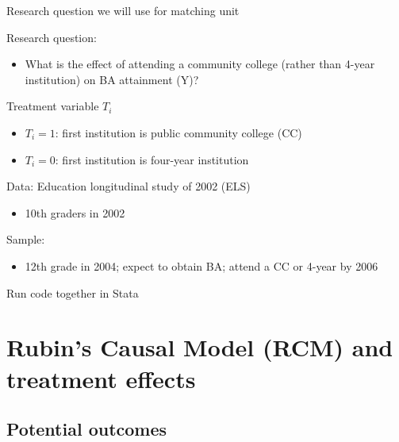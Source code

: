 \begin{frame}{Research question we will use for matching unit}

	Research question:
	\begin{itemize}
		\item What is the effect of attending a community college (rather than 4-year institution) on BA attainment (Y)?
	\end{itemize}
	\vspace{2mm}
	
	Treatment variable $ T_i $
	\begin{itemize}
		\item $ T_i=1 $: first institution is public community college (CC)
		\item $ T_i=0 $: first institution is four-year institution			
	\end{itemize}
	\vspace{2mm}
	Data: Education longitudinal study of 2002 (ELS)
	\begin{itemize}
		\item 10th graders in 2002
	\end{itemize}
	\vspace{2mm}
	Sample:
	\begin{itemize}
		\item 12th grade in 2004; expect to obtain BA; attend a CC or 4-year by 2006
	\end{itemize}
	\vspace{2mm}	
	Run code together in Stata
\end{frame}

\section[RCM \& treatment effects]{Rubin's Causal Model (RCM) and treatment effects}

\subsection{Potential outcomes}

